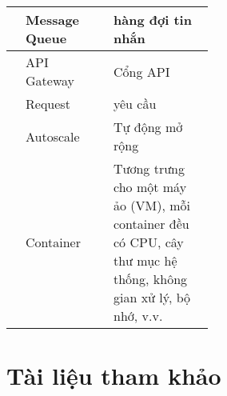 \documentclass[13pt,a4paper,oneside]{book} %
\begin{document}
\begin{table}[h!]
{\begin{tabular}{|ll|p{0.5\linewidth}|}
		\multicolumn{1}{|l|}{}                  & Message Queue          & hàng đợi tin nhắn                              \\ \hline
		\multicolumn{1}{|l|}{}                  & API Gateway          & Cổng API                              \\ \hline
		\multicolumn{1}{|l|}{}                     & Request                                    & yêu cầu                                       \\ \hline
  		\multicolumn{1}{|l|}{}                     & Autoscale                                    & Tự động mở rộng                                       \\ \hline
  		\multicolumn{1}{|l|}{}                     & Container                                    & Tương trưng cho một máy ảo (VM), mỗi container đều có CPU, cây thư mục hệ thống, không gian xử lý, bộ nhớ, v.v.                                        \\ \hline
	\end{tabular}
}
\end{table}
\mainmatter

\changefontsizes[16pt]{13pt}
\pagestyle{plain}







\chapter*{Tài liệu tham khảo}
\printbibliography[keyword={vietnam}, heading=subbibliography, title={Tiếng Việt}, resetnumbers=true]
\printbibliography[notkeyword={vietnam}, heading=subbibliography, title=Tiếng Anh]
\end{document}
